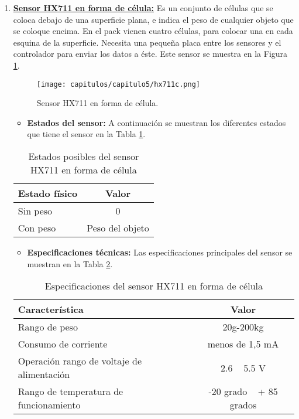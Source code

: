 \begin{enumerate}
\item \underline{\textbf{Sensor HX711 en forma de célula:}} Es un conjunto de células que se coloca debajo de una superficie plana, e indica el peso de cualquier objeto que se coloque encima. En el pack vienen cuatro células, para colocar una en cada esquina de la superficie. Necesita una pequeña placa entre los sensores y el controlador para enviar los datos a éste. Este sensor se muestra en la Figura \ref{fig:hx711c}.

\begin{figure}[h] 
    \centering
    \texttt{[image: capitulos/capitulo5/hx711c.png]}
    \caption{Sensor HX711 en forma de célula.}
    \label{fig:hx711c}
\end{figure}

\newpage
\begin{itemize}
    \item \textbf{Estados del sensor:} A continuación se muestran los diferentes estados que tiene el sensor en la Tabla \ref{tab:hx711c}.
\end{itemize}

\begin{table}[h]
    \centering
    \begin{tabular}{|l|c|}
        \rowcolor[gray]{.5}
        \hline
         \color{white}Estado físico&\color{white}Valor \\
         \hline
         Sin peso&0 \\
         \hline
         Con peso&Peso del objeto  \\
         \hline
    \end{tabular}
    \caption{Estados posibles del sensor HX711 en forma de célula}
    \label{tab:hx711c}
\end{table}

\begin{itemize}
    \item \textbf{Especificaciones técnicas:} Las especificaciones principales del sensor se muestran en la Tabla \ref{tab:hx711cesp}.
\end{itemize}

\begin{table}[h]
    \centering
    \begin{tabular}{|l|c|}
        \rowcolor[gray]{.5}
        \hline
            \color{white}Característica&\color{white}Valor  \\
        \hline
            Rango de peso & 20g-200kg \\
        \hline    
            Consumo de corriente & menos de 1,5 mA  \\
        \hline    
            Operación rango de voltaje de alimentación & 2.6 ~ 5.5 V  \\
        \hline    
            Rango de temperatura de funcionamiento & -20 grado ~ + 85 grados  \\
         \hline
    \end{tabular}
    \caption{Especificaciones del sensor HX711 en forma de célula}
    \label{tab:hx711cesp}
\end{table}
\end{enumerate}

